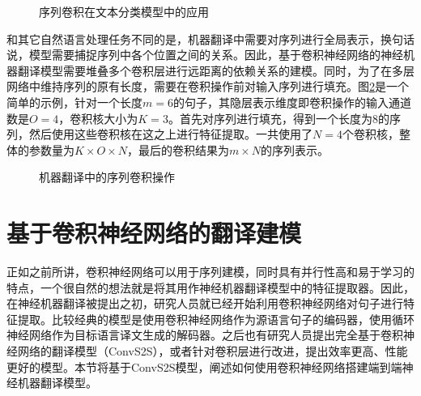 \begin{figure}[htp]
\centering

\caption{序列卷积在文本分类模型中的应用}
\label{fig:11-10}
\end{figure}
\vspace{-1em}
\parinterval 和其它自然语言处理任务不同的是，机器翻译中需要对序列进行全局表示，换句话说，模型需要捕捉序列中各个位置之间的关系。因此，基于卷积神经网络的神经机器翻译模型需要堆叠多个卷积层进行远距离的依赖关系的建模。同时，为了在多层网络中维持序列的原有长度，需要在卷积操作前对输入序列进行填充。图\ref{fig:11-11}是一个简单的示例，针对一个长度$m=6$的句子，其隐层表示维度即卷积操作的输入通道数是$O=4$，卷积核大小为$K=3$。首先对序列进行填充，得到一个长度为8的序列，然后使用这些卷积核在这之上进行特征提取。一共使用了$N=4$个卷积核，整体的参数量为$K \times O \times N$，最后的卷积结果为$m \times N$的序列表示。

\begin{figure}[htp]
\centering
%

\caption{机器翻译中的序列卷积操作}
\label{fig:11-11}
\end{figure}

\section{基于卷积神经网络的翻译建模}

\parinterval 正如之前所讲，卷积神经网络可以用于序列建模，同时具有并行性高和易于学习的特点，一个很自然的想法就是将其用作神经机器翻译模型中的特征提取器。因此，在神经机器翻译被提出之初，研究人员就已经开始利用卷积神经网络对句子进行特征提取。比较经典的模型是使用卷积神经网络作为源语言句子的编码器，使用循环神经网络作为目标语言译文生成的解码器。之后也有研究人员提出完全基于卷积神经网络的翻译模型（ConvS2S），或者针对卷积层进行改进，提出效率更高、性能更好的模型。本节将基于ConvS2S模型，阐述如何使用卷积神经网络搭建端到端神经机器翻译模型。

